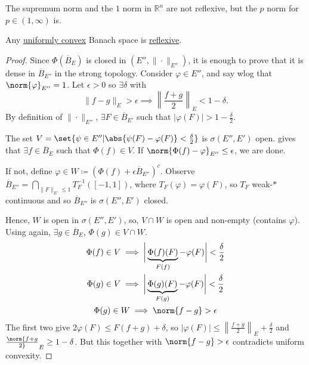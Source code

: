 \documentclass[twoside]{article}
\begin{document}
\begin{eg}
  The supremum norm and the $1$ norm in $\mathbb{R}^n$ are not reflexive, but the $p$ norm for $p \in (1, \infty)$ is.
\end{eg}

\begin{thm}
    Any \hyperlink{def:uc}{uniformly convex} Banach space is \hyperlink{def:refl}{reflexive}.
\end{thm}
\begin{proof}
    Since $\Phi(\overline{B}_E)$ is closed in $(E'', \|\cdot\|_{E''})$, it is enough to prove that it is dense in $\overline{B}_{E''}$ in the strong topology.
    Consider $\varphi \in E''$, and say wlog that $\norm{\varphi}_{E''} = 1$. Let $\epsilon > 0$ so $\exists \delta$ with
    \begin{equation*}
        \|f - g\|_E > \epsilon \implies \left\|\frac{f+g}{2}\right\|_E < 1 - \delta.
    \end{equation*}
    By definition of $\|\cdot\|_{E''}$, $\exists F \in \overline{B}_{E'}$ such that $|\varphi(F)| > 1 - \frac{\delta}{2}$.

    The set $V = \set{\psi \in E'' | \abs{\psi(F) - \varphi(F)} < \frac{\delta}{2}}$ is $\sigma(E'', E')$ open.
     gives that $\exists f \in \overline{B}_E$ such that $\Phi(f) \in V$.
    If $\norm{\Phi(f) - \varphi}_{E''} \leq \epsilon$, we are done.

    If not, define $\varphi \in W \coloneqq (\Phi(f) + \epsilon \overline{B}_{E''})^c$.
    Observe $\overline{B}_{E''} = \bigcap_{\|F\|_{E'} \leq 1} T_F^{-1}([-1, 1])$, where $T_F(\varphi) = \varphi(F)$, so $T_F$ weak-$*$ continuous and so $\overline{B}_{E''}$ is $\sigma(E'', E')$ closed.

    Hence, $W$ is open in $\sigma(E'', E')$, so, $V \cap W$ is open and non-empty (contains $\varphi$).
    Using  again, $\exists g \in \overline{B}_E$, $\Phi(g) \in V \cap W$.
    \begin{gather*}
        \Phi(f) \in V \implies \bigg|\underbrace{\Phi(f)(F)}_{F(f)} - \varphi(F)\bigg| < \frac{\delta}{2} \\
        \Phi(g) \in V \implies \bigg|\underbrace{\Phi(g)(F)}_{F(g)} - \varphi(F)\bigg| < \frac{\delta}{2} \\
        \Phi(g) \in W \implies \norm{f-g} > \epsilon
    \end{gather*}
    The first two give $2 \varphi(F) \leq F(f+g) + \delta$, so $|\varphi(F)| \leq \left\|\frac{f+g}{2}\right\|_E + \frac{\delta}{2}$ and $\norm{f+g \over 2}_E \geq 1 - \delta$.
    But this together with $\norm{f-g} > \epsilon$ contradicts uniform convexity.
\end{proof}
\end{document}
